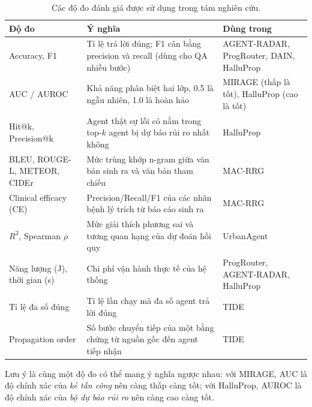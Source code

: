 \begin{table}[!htbp]
\centering
\small
\caption{Các độ đo đánh giá được sử dụng trong tám nghiên cứu.}
\label{tab:metrics}
\begin{tabularx}{\textwidth}{L{3.2cm} Y L{2.8cm}}
\toprule
\textbf{Độ đo} & \textbf{Ý nghĩa} & \textbf{Dùng trong} \\
\midrule
Accuracy, F1 & Tỉ lệ trả lời đúng; F1 cân bằng precision và recall (dùng cho QA nhiều bước) & AGENT-RADAR, ProgRouter, DAIN, HalluProp \\
AUC / AUROC & Khả năng phân biệt hai lớp, 0.5 là ngẫu nhiên, 1.0 là hoàn hảo & MIRAGE (thấp là tốt), HalluProp (cao là tốt) \\
Hit@k, Precision@k & Agent thật sự lỗi có nằm trong top-$k$ agent bị dự báo rủi ro nhất không & HalluProp \\
BLEU, ROUGE-L, METEOR, CIDEr & Mức trùng khớp n-gram giữa văn bản sinh ra và văn bản tham chiếu & MAC-RRG \\
Clinical efficacy (CE) & Precision/Recall/F1 của các nhãn bệnh lý trích từ báo cáo sinh ra & MAC-RRG \\
$R^2$, Spearman $\rho$ & Mức giải thích phương sai và tương quan hạng của dự đoán hồi quy & UrbanAgent \\
Năng lượng (J), thời gian (s) & Chi phí vận hành thực tế của hệ thống & ProgRouter, AGENT-RADAR, HalluProp \\
Tỉ lệ đa số đúng & Tỉ lệ lần chạy mà đa số agent trả lời đúng & TIDE \\
Propagation order & Số bước chuyển tiếp của một bằng chứng từ nguồn gốc đến agent tiếp nhận & TIDE \\
\bottomrule
\end{tabularx}
\end{table}

Lưu ý là cùng một độ đo có thể mang ý nghĩa ngược nhau: với MIRAGE, AUC là độ chính xác của \emph{kẻ tấn công} nên càng thấp càng tốt; với HalluProp, AUROC là độ chính xác của \emph{bộ dự báo rủi ro} nên càng cao càng tốt.
